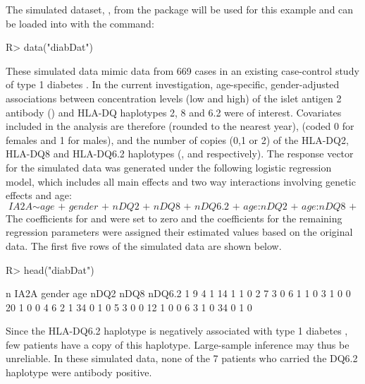 \documentclass[article, shortnames]{jss}
\begin{document}
The simulated dataset, , from the  package
will be used for this example and can be loaded into 
with the command:
\begin{CodeInput}
R> data("diabDat")
\end{CodeInput}
These simulated data mimic data from 669 cases in an existing
case-control study of type 1 diabetes \citep{Graham:1999}. In the
current investigation, age-specific, gender-adjusted associations
between concentration levels (low and high) of the islet antigen 2
antibody () and HLA-DQ haplotypes 2, 8 and 6.2 were of
interest. Covariates included in the analysis are therefore
 (rounded to the nearest year),  (coded 0
for females and 1 for males), and the number of copies (0,1 or 2)
of the HLA-DQ2, HLA-DQ8 and HLA-DQ6.2 haplotypes (,
 and  respectively). The response vector
for the simulated data was generated under the following logistic
regression model, which includes all main effects and two way
interactions involving genetic effects and age:
\begin{equation*}
\textit{IA2A} \sim \textit{age + gender + nDQ2 + nDQ8 + nDQ6.2 +
age:nDQ2 + age:nDQ8 + age:nDQ6.2}
\end{equation*}
The coefficients for  and  were set
to zero and the coefficients for the remaining regression
parameters were assigned their estimated values based on the
original data. The first five rows of the simulated data are shown
below.
\begin{CodeChunk}
\begin{CodeInput}
R> head("diabDat")
\end{CodeInput}
\begin{CodeOutput}
  n IA2A gender age nDQ2 nDQ8 nDQ6.2
1 9    4      1  14    1    1      0
2 7    3      0   6    1    1      0
3 1    0      0  20    1    0      0
4 6    2      1  34    0    1      0
5 3    0      0  12    1    0      0
6 3    1      0  34    0    1      0
\end{CodeOutput}
\end{CodeChunk}
Since the HLA-DQ6.2 haplotype is negatively associated with
type 1 diabetes \citep[e.g.][]{Graham:1999}, few patients
have a copy of this haplotype.
Large-sample inference
may thus be
unreliable.
In these simulated data, none of the 7 patients
who carried the DQ6.2 haplotype
were antibody positive.
\end{document}
